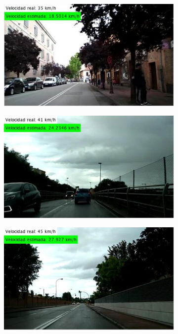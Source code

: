 \begin{figure}[H]
\centering
  \begin{subfigure}[b]{0.475\linewidth}
    \includegraphics[width=\linewidth]{Figuras/Resultado_SVR_Urbano_MAL_1.eps}
  \end{subfigure}
  \begin{subfigure}[b]{0.475\linewidth}
    \includegraphics[width=\linewidth]{Figuras/Resultado_SVR_Urbano_MAL_2.eps}
  \end{subfigure}
  \begin{subfigure}[b]{0.475\linewidth}
    \includegraphics[width=\linewidth]{Figuras/Resultado_SVR_Urbano_MAL_3.eps}

\end{subfigure}
\end{figure}
